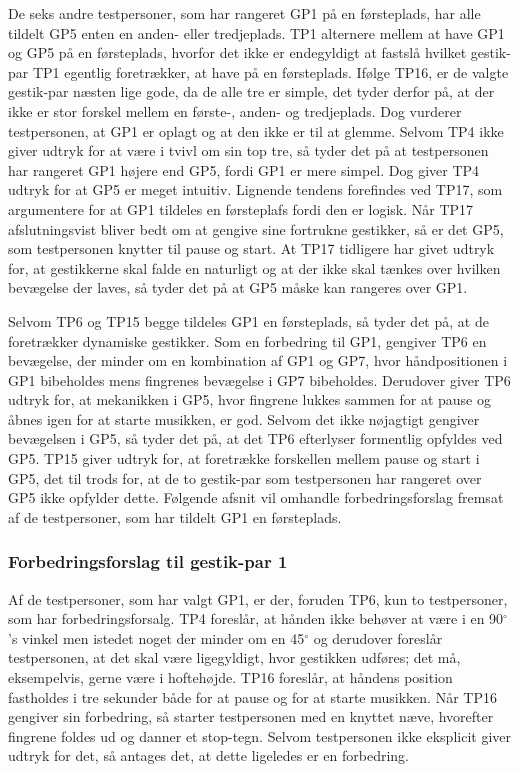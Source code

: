 De seks andre testpersoner, som har rangeret GP1 på en førsteplads, har alle tildelt GP5 enten en anden- eller tredjeplads. TP1 alternere mellem at have GP1 og GP5 på en førsteplads, hvorfor det ikke er endegyldigt at fastslå hvilket gestik-par TP1 egentlig foretrækker, at have på en førsteplads. Ifølge TP16, er de valgte gestik-par næsten lige gode, da de alle tre er simple, det tyder derfor på, at der ikke er stor forskel mellem en første-, anden- og tredjeplads. Dog vurderer testpersonen, at GP1 er oplagt og at den ikke er til at glemme. Selvom TP4 ikke giver udtryk for at være i tvivl om sin top tre, så tyder det på at testpersonen har rangeret GP1 højere end GP5, fordi GP1 er mere simpel. Dog giver TP4 udtryk for at GP5 er meget intuitiv. Lignende tendens forefindes ved TP17, som argumentere for at GP1 tildeles en førsteplafs fordi den er logisk. Når TP17 afslutningsvist bliver bedt om at gengive sine fortrukne gestikker, så er det GP5, som testpersonen knytter til pause og start. At TP17 tidligere har givet udtryk for, at gestikkerne skal falde en naturligt og at der ikke skal tænkes over hvilken bevægelse der laves, så tyder det på at GP5 måske kan rangeres over GP1.

Selvom TP6 og TP15 begge tildeles GP1 en førsteplads, så tyder det på, at de foretrækker dynamiske gestikker. Som en forbedring til GP1, gengiver TP6 en bevægelse, der minder om en kombination af GP1 og GP7, hvor håndpositionen i GP1 bibeholdes mens fingrenes bevægelse i GP7 bibeholdes. Derudover giver TP6 udtryk for, at mekanikken i GP5, hvor fingrene lukkes sammen for at pause og åbnes igen for at starte musikken, er god. Selvom det ikke nøjagtigt gengiver bevægelsen i GP5, så tyder det på, at det TP6 efterlyser formentlig opfyldes ved GP5. TP15 giver udtryk for, at foretrække forskellen mellem pause og start i GP5, det til trods for, at de to gestik-par som testpersonen har rangeret over GP5 ikke opfylder dette.\blankline
%
Følgende afsnit vil omhandle forbedringsforslag fremsat af de testpersoner, som har tildelt GP1 en førsteplads.
%
\subsubsection{Forbedringsforslag til gestik-par 1}
\label{TestresultaterValgAfGestikkerForbedringGP1}
%
Af de testpersoner, som har valgt GP1, er der, foruden TP6, kun to testpersoner, som har forbedringsforsalg. TP4 foreslår, at hånden ikke behøver at være i en 90$^{\circ}$'s vinkel men istedet noget der minder om en 45$^{\circ}$ og derudover foreslår testpersonen, at det skal være ligegyldigt, hvor gestikken udføres; det må, eksempelvis, gerne være i hoftehøjde. TP16 foreslår, at håndens position fastholdes i tre sekunder både for at pause og for at starte musikken. Når TP16 gengiver sin forbedring, så starter testpersonen med en knyttet næve, hvorefter fingrene foldes ud og danner et stop-tegn. Selvom testpersonen ikke eksplicit giver udtryk for det, så antages det, at dette ligeledes er en forbedring.
%
